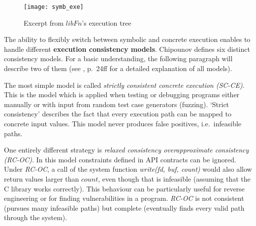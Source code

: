 \begin{figure}
\texttt{[image: symb\_exe]}
\caption{Excerpt from $libFn$'s execution tree \cite{chip12s2e}}
\label{fig:ssetree2}
\end{figure}


\medskip
The ability to flexibly switch between symbolic and concrete execution enables \sse to handle different \textbf{execution consistency models}.
Chipounov defines six distinct consistency models.
For a basic understanding, the following paragraph will describe two of them (see \cite{chip14s2e}, p.~24ff for a detailed explanation of all models).

The most simple model is called \textit{strictly consistent concrete execution (SC-CE)}.
This is the model which is applied when testing or debugging programs either manually or with input from random test case generators (fuzzing).
`Strict consistency' describes the fact that every execution path can be mapped to concrete input values.
This model never produces false positives, i.e.~infeasible paths.


One entirely different strategy is \textit{relaxed consistency overapproximate consistency (RC-OC)}.
In this model constraints defined in API contracts can be ignored.
Under \textit{RC-OC}, a call of the system function \textit{write(fd, buf, count)} would also allow return values larger than $count$, even though that is infeasible (assuming that the C library works correctly).
This behaviour can be particularly useful for reverse engineering or for finding vulnerabilities in a program.
\textit{RC-OC} is not consistent (pursues many infeasible paths) but complete (eventually finds every valid path through the system).


\iffalse
§2	Selective Symbolic Execution
		> Theorie-Teil
		> Was ist Symbolic Execution?
		> Was kann Selective Symbolic Execution besser?
			(Concrete -> symbolic transition usw.)
		> Konsistenzmodelle (wird hier evtl. schwierig, das richtige Maß 
			zu finden, um die Sache auf wenig Platz zu verstehen)
\fi
